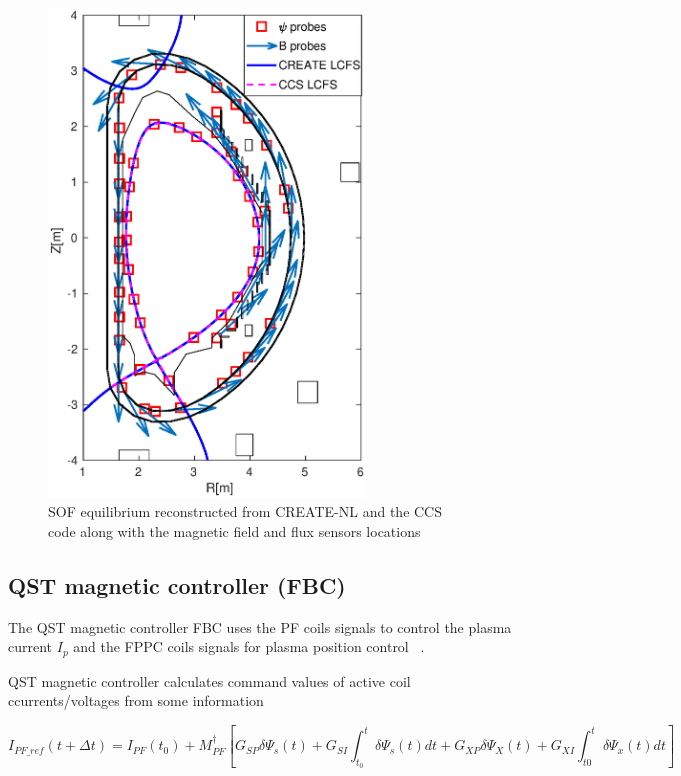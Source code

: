 \begin{figure}
	\centering
	\includegraphics[width=0.75\textwidth]{Chp3/sensors_plots_newDirection.eps}
	\caption{SOF equilibrium reconstructed from CREATE-NL and the CCS code along with the  magnetic field and flux sensors locations	\label{JT60sensors} }
\end{figure}


\subsection{QST magnetic controller (FBC)}


The QST magnetic controller FBC uses the PF coils signals to control the plasma current $I_p$ and the FPPC coils signals for plasma position control ~\cite{FBC}.

QST magnetic controller calculates command values of active coil ccurrents/voltages from some information

\begin{equation}
I_{PF\_ref}(t+\Delta t) = I_{PF}(t_0)+M^\dagger_{PF}\left[G_{SP}\delta\Psi_s(t)+G_{SI}\int_{t_0}^{t}\delta\Psi_s(t)dt+G_{XP}\delta\Psi_X(t)+G_{XI}\int_{t0}^{t}\delta\Psi_x(t)dt\right]
\end{equation}

